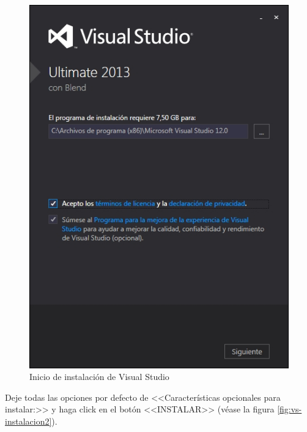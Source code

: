 \begin{figure}[H]
  \centering
  \includegraphics[width=.8\linewidth]{./img/vs-instalacion1.jpg}
\caption[]{Inicio de instalaci\'{o}n de Visual Studio\label{fig:vs-instalacion1}}
\end{figure}
\newpage
Deje todas las opciones por defecto de <<Caracter\'{i}sticas opcionales para instalar:>> y haga click en el bot\'{o}n <<INSTALAR>> (v\'{e}ase la figura \ref{fig:vs-instalacion2}).	

